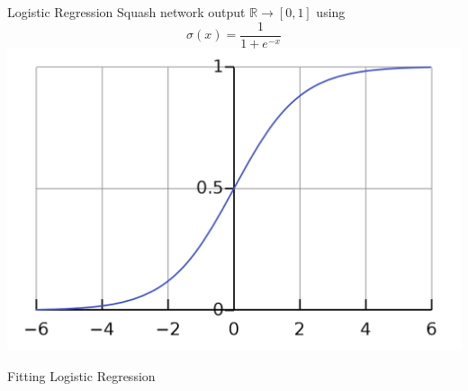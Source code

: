 \documentclass{beamer}
\begin{document}
\begin{frame}{Logistic Regression}
Squash network output $\mathbb{R}\rightarrow [0,1]$ using
\begin{equation*}
\sigma(x) = \frac{1}{1+e^{-x}}
\end{equation*}
\includegraphics[width=\textwidth]{logistic_function.png}

\end{frame}

\begin{frame}{Fitting Logistic Regression}

\end{frame}
\end{document}

